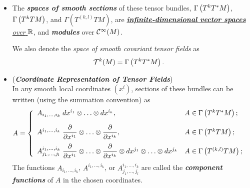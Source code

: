 \documentclass[11pt]{article}
\begin{document}
\begin{itemize}
\item \begin{remark}
The \emph{\textbf{spaces of smooth sections}} of these tensor bundles, \underline{$\Gamma\left(T^kT^{*}M\right)$},  \underline{$\Gamma\left(T^kTM\right)$}, and  \underline{$\Gamma(T^{(k,l)}TM)$}, are \underline{\emph{\textbf{infinite-dimensional vector spaces} over} ${\mathbb R}$}, and \emph{\textbf{modules}} over ${\mathcal C}^{\infty}(M)$. 

We also denote the \emph{space of smooth covariant tensor fields} as 
\begin{align*}
\mathcal{T}^{k}(M) &= \Gamma\left(T^kT^{*}M\right).
\end{align*}
\end{remark}

\item \begin{remark} (\emph{\textbf{Coordinate Representation of Tensor Fields}})\\
In any smooth local coordinates $(x^i)$, sections of these bundles can be written (using the summation convention) as
\begin{align}
A &= \left\{
\begin{array}{ll}
A_{i_1,\ldots,i_k}\;dx^{i_1}\otimes \ldots \otimes dx^{i_k},                                        & A \in \Gamma\left(T^kT^{*}M\right);\\[10pt]
A^{i_1,\ldots,i_k}\;\dfrac{\partial}{\partial x^{i_1}} \otimes \ldots \otimes \dfrac{\partial}{\partial x^{i_k}}, & A \in \Gamma\left(T^kTM\right);\\[10pt]
A^{i_1,\ldots,i_k}_{j_1,\ldots,j_l}\;\dfrac{\partial}{\partial x^{i_1}} \otimes \ldots \otimes \dfrac{\partial}{\partial x^{i_k}} \otimes dx^{j_1}\otimes \ldots \otimes dx^{j_k} 
&  A \in \Gamma\left(T^{(k,l)}TM\right);
\end{array}
 \right.\label{eqn: coordinate_tensor_fields}
\end{align} The functions $A_{i_1,\ldots,i_k}$, $A^{i_1,\ldots,i_k}$, or $A^{i_1,\ldots,i_k}_{j_1,\ldots,j_l}$ are called the \emph{\textbf{component functions}} of $A$
in the chosen coordinates. 
\end{remark}


\end{itemize}
\end{document}
